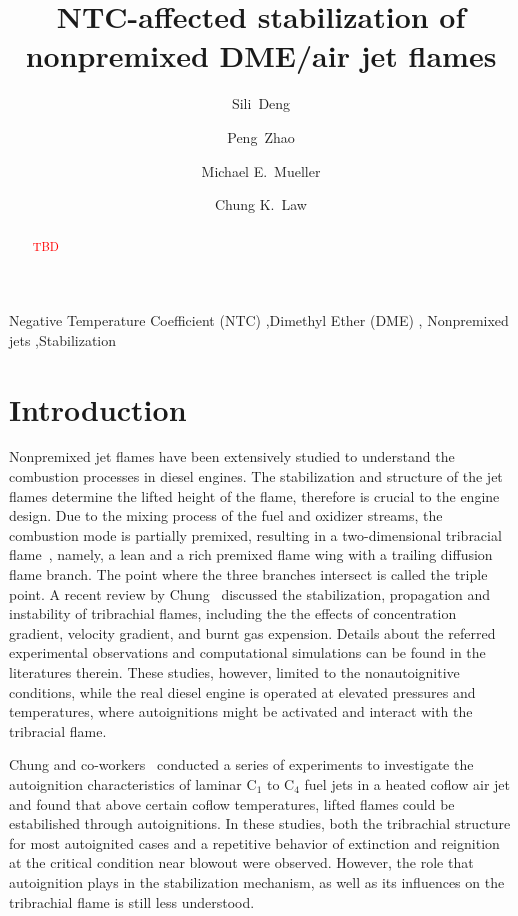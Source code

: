 \documentclass[review,3p,times]{elsarticleUS}
\begin{document}
\begin{frontmatter}

\title{NTC-affected stabilization of nonpremixed DME/air jet flames}

\author{Sili~Deng}
\author{Peng~Zhao}
\author{Michael E.~Mueller}
\author{Chung K.~Law}

\address{Department of Mechanical and Aerospace Engineering, Princeton University, Princeton, NJ 08544, USA}

\begin{abstract}
\textcolor{red}{TBD}

\end{abstract}

\begin{keyword} 
Negative Temperature Coefficient (NTC) \sep Dimethyl Ether (DME) \sep
Nonpremixed jets \sep Stabilization 
\end{keyword}

\end{frontmatter}

\section{Introduction}

Nonpremixed jet flames have been extensively studied to understand the combustion processes in diesel engines.  The stabilization and structure of the jet flames determine the lifted height of the flame, therefore is crucial to the engine design.  Due to the mixing process of the fuel and oxidizer streams, the combustion mode is partially premixed, resulting in a two-dimensional tribracial flame~\cite{buckmaster02}, namely, a lean and a rich premixed flame wing with a trailing diffusion flame branch.  The point where the three branches intersect is called the triple point.  A recent review by Chung~\cite{chung07} discussed the stabilization, propagation and instability of tribrachial flames, including the the effects of concentration gradient, velocity gradient, and burnt gas expension.  Details about the referred experimental observations and computational simulations can be found in the literatures therein. These studies, however, limited to the nonautoignitive conditions, while the real diesel engine is operated at elevated pressures and temperatures, where autoignitions might be activated and interact with the tribracial flame. 

Chung and co-workers~\cite{choi09,choi10,choi12} conducted a series of experiments to investigate the autoignition characteristics of laminar C$_1$ to C$_4$ fuel jets in a heated coflow air jet and found that above certain coflow temperatures, lifted flames could be estabilished through autoignitions.  In these studies, both the tribrachial structure for most autoignited cases and a repetitive behavior of extinction and reignition at the critical condition near blowout were observed.  However, the role that autoignition plays in the stabilization mechanism, as well as its influences on the tribrachial flame is still less understood.  
\end{document}
